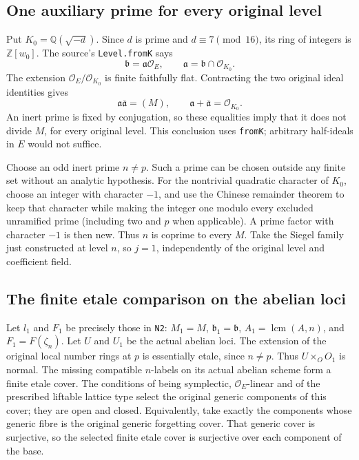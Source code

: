 \subsection*{One auxiliary prime for every original level}

Put $K_0=\mathbb Q(\sqrt{-d})$.  Since $d$ is prime and
$d\equiv7\pmod {16}$, its ring of integers is
$\mathbb Z[w_0]$.  The source's \texttt{Level.fromK} says
\[
      \mathfrak b=\mathfrak a\mathcal O_E,
      \qquad \mathfrak a=\mathfrak b\cap\mathcal O_{K_0}.
\]
The extension $\mathcal O_E/\mathcal O_{K_0}$ is finite faithfully
flat.  Contracting the two original ideal identities gives
\[
          \mathfrak a\overline{\mathfrak a}=(M),
          \qquad \mathfrak a+\overline{\mathfrak a}=\mathcal O_{K_0}.
\]
An inert prime is fixed by conjugation, so these equalities imply
that it does not divide $M$, for every original level.
This conclusion uses \texttt{fromK}; arbitrary half-ideals in
$E$ would not suffice.

Choose an odd inert prime $n\ne p$.  Such a prime can be chosen
outside any finite set without an analytic hypothesis.  For the
nontrivial quadratic character of $K_0$, choose an integer with
character $-1$, and use the Chinese remainder theorem to keep that
character while making the integer one modulo every excluded
unramified prime (including two and $p$ when applicable).
A prime factor with character $-1$ is then new.  Thus
$n$ is coprime to every $M$.  Take the Siegel family just constructed
at level $n$, so $j=1$, independently of the original level and
coefficient field.

\subsection*{The finite etale comparison on the abelian loci}

Let $l_1$ and $F_1$ be precisely those in \texttt{N2}:
$M_1=M$, $\mathfrak b_1=\mathfrak b$,
$A_1=\operatorname{lcm}(A,n)$, and $F_1=F(\zeta_n)$.
Let $U$ and $U_1$ be the actual abelian loci.
The extension of the original local number rings at $p$ is
essentially etale, since $n\ne p$.  Thus $U\times_OO_1$ is normal.
The missing compatible $n$-labels on its actual abelian scheme
form a finite etale cover.  The conditions of being symplectic,
$\mathcal O_E$-linear and of the prescribed liftable lattice type
select the original generic components of this cover; they are
open and closed.  Equivalently, take exactly the components whose
generic fibre is the original generic forgetting cover.
That generic cover is surjective, so the selected finite etale
cover is surjective over each component of the base.

